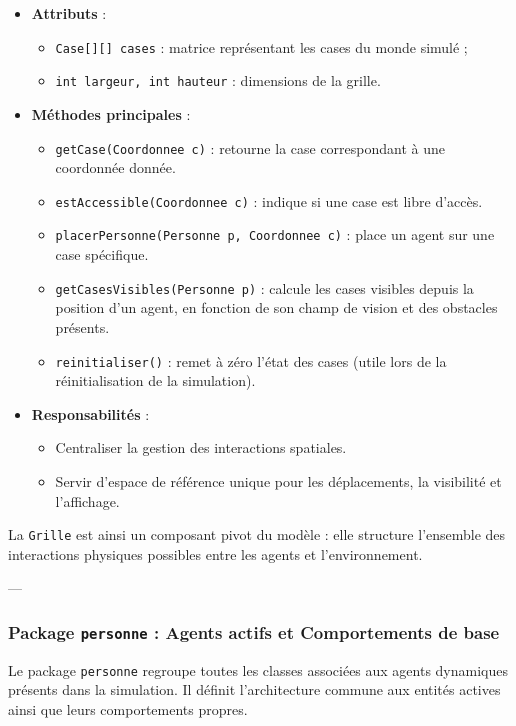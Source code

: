 \begin{itemize}
    \item \textbf{Attributs} :
    \begin{itemize}
        \item \texttt{Case[][] cases} : matrice représentant les cases du monde simulé ;
        \item \texttt{int largeur, int hauteur} : dimensions de la grille.
    \end{itemize}
    \item \textbf{Méthodes principales} :
    \begin{itemize}
        \item \texttt{getCase(Coordonnee c)} : retourne la case correspondant à une coordonnée donnée.
        \item \texttt{estAccessible(Coordonnee c)} : indique si une case est libre d’accès.
        \item \texttt{placerPersonne(Personne p, Coordonnee c)} : place un agent sur une case spécifique.
        \item \texttt{getCasesVisibles(Personne p)} : calcule les cases visibles depuis la position d'un agent, en fonction de son champ de vision et des obstacles présents.
        \item \texttt{reinitialiser()} : remet à zéro l'état des cases (utile lors de la réinitialisation de la simulation).
    \end{itemize}
    \item \textbf{Responsabilités} :
    \begin{itemize}
        \item Centraliser la gestion des interactions spatiales.
        \item Servir d’espace de référence unique pour les déplacements, la visibilité et l’affichage.
    \end{itemize}
\end{itemize}

La \texttt{Grille} est ainsi un composant pivot du modèle : elle structure l’ensemble des interactions physiques possibles entre les agents et l’environnement.

---

\subsubsection{ Package \texttt{personne} : Agents actifs et Comportements de base}

Le package \texttt{personne} regroupe toutes les classes associées aux agents dynamiques présents dans la simulation. Il définit l’architecture commune aux entités actives ainsi que leurs comportements propres.

